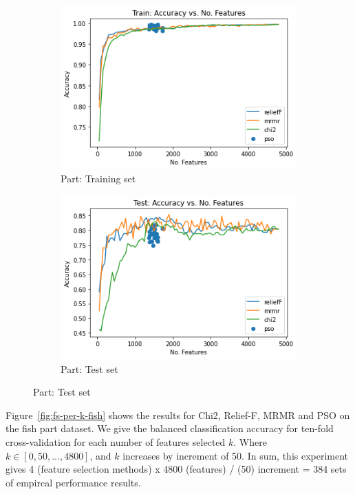 \documentclass[runningheads]{llncs}
\begin{document}
\begin{figure}[htb]
  \centering
  \caption[Two numerical solutions]{
      FS Classification Accuracy per $k$
    }
  \begin{subfigure}[b]{.55\linewidth}
    \includegraphics[width=\linewidth]{accuracy-features-part-train.png}
    \caption{Part: Training set}\label{fig:fs-per-k-part-part-train}
  \end{subfigure}
  \begin{subfigure}[b]{.55\linewidth}
    \includegraphics[width=\linewidth]{accuracy-features-part-test.png}
    \caption{Part: Test set}\label{fig:fs-per-k-part-part-test}
  \end{subfigure}
  \label{fig:fs-per-k-part}
\end{figure}

Figure~\ref{fig:fs-per-k-fish} shows the results for Chi2, Relief-F, MRMR and PSO on the fish part dataset. 
We give the balanced classification accuracy for ten-fold cross-validation for each number of features selected $k$.
Where $k \in [0,50,...,4800]$, and $k$ increases by increment of 50.
In sum, this experiment gives 4 (feature selection methods) x 4800 (features) / (50) increment = 384 sets of empircal performance results. 
 
\end{document}
